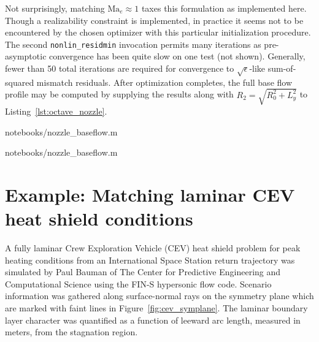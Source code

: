 \documentclass[letterpaper,11pt,nointlimits,reqno]{amsart}
\newcommand{\Mach}[1][]{\mbox{Ma}_{#1}}
\begin{document}
Not surprisingly, matching $\Mach[e]{}\approx{}1$ taxes this formulation as
implemented here.  Though a realizability constraint is implemented, in practice
it seems not to be encountered by the chosen optimizer with this particular
initialization procedure.  The second \texttt{nonlin\_residmin} invocation
permits many iterations as pre-asymptotic convergence has been quite slow on
one test (not shown).  Generally, fewer than 50 total iterations are required
for convergence to $\sqrt{\epsilon}$-like sum-of-squared mismatch residuals.
After optimization completes, the full base flow profile may be computed by
supplying the results along with $R_2 = \sqrt{R_0^2 + L_y^2}$ to
Listing~\ref{lst:octave_nozzle}.


                {notebooks/nozzle_baseflow.m}


                {notebooks/nozzle_baseflow.m}

\clearpage

\section{Example: Matching laminar CEV heat shield conditions}

A fully laminar Crew Exploration Vehicle (CEV) heat shield problem for peak
heating conditions from an International Space Station return trajectory was
simulated by Paul Bauman of The Center for Predictive Engineering and
Computational Science using the FIN-S hypersonic flow
code\citep{KirkModeling2013}.  Scenario information was gathered along
surface-normal rays on the symmetry plane which are marked with faint lines in
Figure~\ref{fig:cev_symplane}.  The laminar boundary layer character was
quantified as a function of leeward arc length, measured in meters, from the
stagnation region.
\end{document}
